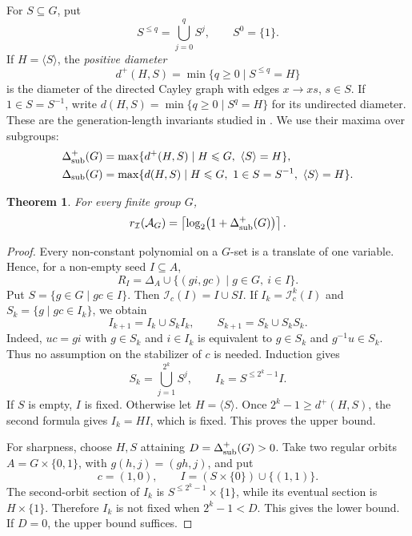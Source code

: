 \documentclass[12pt,english]{amsart}
\newtheorem{theorem}{Theorem}[section]
\theoremstyle{definition}
\numberwithin{equation}{section}
\theoremstyle{remark}
\begin{document}
For $S\subseteq G$, put
\[
S^{\leqslant q}=\bigcup_{j=0}^q S^j,\qquad S^0=\{1\}.
\]
If $H=\langle S\rangle$, the \emph{positive diameter}
\[
d^+(H,S)=\min\{q\geqslant0\mid S^{\leqslant q}=H\}
\]
is the diameter of the directed Cayley graph with edges $x\to xs$,
$s\in S$. If $1\in S=S^{-1}$, write
$d(H,S)=\min\{q\geqslant0\mid S^q=H\}$ for its undirected
diameter. These are the generation-length invariants studied in
\cite{KL03,KL09}. We use their maxima over subgroups:
\begin{align*}
\Delta^+_{\rm sub}(G)
 &=\max\{d^+(H,S)\mid H\leqslant G,\ \langle S\rangle=H\},\\
\Delta_{\rm sub}(G)
 &=\max\{d(H,S)\mid H\leqslant G,\ 1\in S=S^{-1},\
                              \langle S\rangle=H\}.
\end{align*}

\begin{theorem}\label{ThmGroupInductiveDiameter}
For every finite group $G$,
\[
r_{\mathcal I}(\mathcal A_G)
=\left\lceil\log_2\bigl(1+\Delta^+_{\rm sub}(G)\bigr)\right\rceil.
\]
\end{theorem}

\begin{proof}
Every non-constant polynomial on a $G$-set is a translate of one
variable. Hence, for a non-empty seed $I\subseteq A$,
\begin{equation}\label{EqGroupActionRelation}
R_I=\Delta_A\cup\{(gi,gc)\mid g\in G,\ i\in I\}.
\end{equation}
Put $S=\{g\in G\mid gc\in I\}$. Then
$\mathcal I_c(I)=I\cup SI$. If
$I_k=\mathcal I_c^k(I)$ and $S_k=\{g\mid gc\in I_k\}$, we obtain
\[
I_{k+1}=I_k\cup S_kI_k,\qquad
S_{k+1}=S_k\cup S_kS_k.
\]
Indeed, $uc=gi$ with $g\in S_k$ and $i\in I_k$ is equivalent
to $g\in S_k$ and $g^{-1}u\in S_k$. Thus no assumption on the
stabilizer of $c$ is needed. Induction gives
\begin{equation}\label{EqGroupInductionBalls}
S_k=\bigcup_{j=1}^{2^k}S^j,\qquad
I_k=S^{\leqslant 2^k-1}I.
\end{equation}
If $S$ is empty, $I$ is fixed. Otherwise let $H=\langle S\rangle$.
Once $2^k-1\geqslant d^+(H,S)$, the second formula gives
$I_k=HI$, which is fixed. This proves the upper bound.

For sharpness, choose $H,S$ attaining
$D=\Delta^+_{\rm sub}(G)>0$. Take two regular orbits
$A=G\times\{0,1\}$, with $g(h,j)=(gh,j)$, and put
\[
c=(1,0),\qquad I=(S\times\{0\})\cup\{(1,1)\}.
\]
The second-orbit section of $I_k$ is
$S^{\leqslant 2^k-1}\times\{1\}$, while its eventual section is
$H\times\{1\}$. Therefore $I_k$ is not fixed when $2^k-1<D$.
This gives the lower bound. If $D=0$, the upper bound suffices.
\end{proof}
\end{document}
